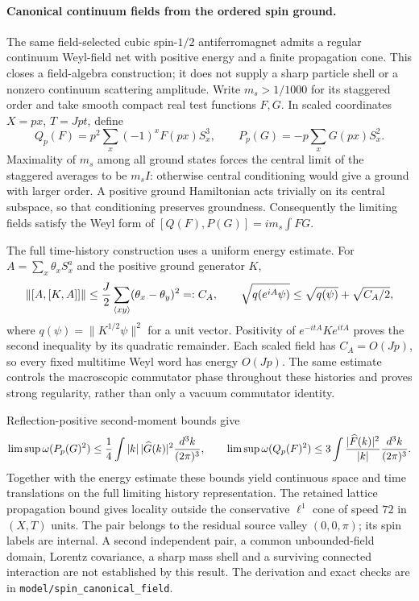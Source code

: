 \paragraph{Canonical continuum fields from the ordered spin ground.}
The same field-selected cubic spin-$1/2$ antiferromagnet admits a regular
continuum Weyl-field net with positive energy and a finite propagation cone.
This closes a field-algebra construction; it does not supply a sharp
particle shell or a nonzero continuum scattering amplitude.
Write $m_s>1/1000$ for its staggered order and take smooth compact real
test functions $F,G$. In scaled coordinates $X=px$, $T=Jpt$, define
\[
 Q_p(F)=p^2\sum_x(-1)^xF(px)S_x^3,
 \qquad P_p(G)=-p\sum_xG(px)S_x^2.
\]
Maximality of $m_s$ among all ground states forces the central limit of
the staggered averages to be $m_s I$: otherwise central conditioning
would give a ground with larger order. A positive ground Hamiltonian
acts trivially on its central subspace, so that conditioning preserves
groundness. Consequently the limiting fields satisfy the Weyl form of
$[Q(F),P(G)]=i m_s\int FG$.

The full time-history construction uses a uniform energy estimate.
For $A=\sum_x\theta_x S_x^a$ and the positive ground generator $K$,
\[
 \|[A,[K,A]]\|\le {J\over2}
       \sum_{\langle xy\rangle}(\theta_x-\theta_y)^2=:C_A,
 \qquad
 \sqrt{q(e^{iA}\psi)}\le\sqrt{q(\psi)}+\sqrt{C_A/2},
\]
where $q(\psi)=\|K^{1/2}\psi\|^2$ for a unit vector.
Positivity of $e^{-itA}Ke^{itA}$ proves the second inequality by its
quadratic remainder. Each scaled field has $C_A=O(Jp)$, so every fixed
multitime Weyl word has energy $O(Jp)$. The same estimate controls the
macroscopic commutator phase throughout these histories and proves
strong regularity, rather than only a vacuum commutator identity.

Reflection-positive second-moment bounds give
\[
 \limsup\omega(P_p(G)^2)\le {1\over4}
       \int |k|\,|\widehat G(k)|^2{d^3k\over(2\pi)^3},
 \qquad
 \limsup\omega(Q_p(F)^2)\le 3
       \int {|\widehat F(k)|^2\over|k|}{d^3k\over(2\pi)^3}.
\]
Together with the energy estimate these bounds yield continuous space
and time translations on the full limiting history representation.
The retained lattice propagation bound gives locality outside the
conservative $\ell^1$ cone of speed $72$ in $(X,T)$ units.
The pair belongs to the residual source valley $(0,0,\pi)$;
its spin labels are internal. A second independent pair, a common
unbounded-field domain, Lorentz covariance, a sharp mass shell and a
surviving connected interaction are not established by this result.
The derivation and exact checks are in
\texttt{model/spin\_canonical\_field}.

